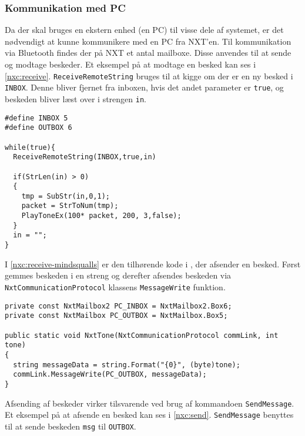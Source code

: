 \subsubsection{Kommunikation med PC}
Da der skal bruges en ekstern enhed (en PC) til visse dele af systemet, er det nødvendigt at kunne kommunikere med en PC fra NXT'en.
Til kommunikation via Bluetooth findes der på NXT et antal mailboxe.
Disse anvendes til at sende og modtage beskeder.
Et eksempel på at modtage en besked kan ses i \cref{nxc:receive}.
\lstinline[style=c]|ReceiveRemoteString| bruges til at kigge om der er en ny besked i \lstinline[style=c]!INBOX!.
Denne bliver fjernet fra inboxen, hvis det andet parameter er \lstinline[style=c]|true|, og beskeden bliver læst over i strengen \lstinline[style=c]|in|.

\begin{lstlisting}[style=c,label=nxc:receive,caption={Et eksempel på at modtage beskeder over Bluetooth.}]
#define INBOX 5
#define OUTBOX 6

while(true){
  ReceiveRemoteString(INBOX,true,in)
  
  if(StrLen(in) > 0)
  {
    tmp = SubStr(in,0,1);
    packet = StrToNum(tmp);
    PlayToneEx(100* packet, 200, 3,false);
  }
  in = "";
}
\end{lstlisting}

I \cref{nxc:receive-mindsqualls} er den tilhørende kode i \mindsqualls, der afsender en besked.
Først gemmes beskeden i en streng og derefter afsendes beskeden via \lstinline[style=csharp]!NxtCommunicationProtocol! klassens \lstinline[style=csharp]!MessageWrite! funktion.

\begin{lstlisting}[style=c,breaklines=true, label=nxc:receive-mindsqualls,caption={\mindsqualls kode der afsender en besked.}]
private const NxtMailbox2 PC_INBOX = NxtMailbox2.Box6;
private const NxtMailbox PC_OUTBOX = NxtMailbox.Box5;

public static void NxtTone(NxtCommunicationProtocol commLink, int tone)
{
  string messageData = string.Format("{0}", (byte)tone);
  commLink.MessageWrite(PC_OUTBOX, messageData);
}
\end{lstlisting}

Afsending af beskeder virker tilsvarende ved brug af kommandoen \lstinline[style=c]|SendMessage|.
Et eksempel på at afsende en besked kan ses i \cref{nxc:send}.
\lstinline[style=c]|SendMessage| benyttes til at sende beskeden \lstinline[style=c]|msg| til \lstinline[style=c]!OUTBOX!.

